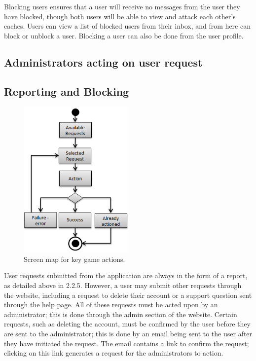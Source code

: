 Blocking users ensures that a user will receive no messages from the user they have blocked, though both users will be able to view and attack each other’s caches. Users can view a list of blocked users from their inbox, and from here can block or unblock a user. Blocking a user can  also be done from the user profile.

\subsection{Administrators acting on user request}

\subsection{Reporting and Blocking}
\begin{figure}
	\vspace{-20pt}
	\begin{center}
	\includegraphics[width=0.5\textwidth]{images/admins_acting}
	\caption{Screen map for key game actions.}
	\end{center}
	\vspace{-20pt}
\end{figure}

User requests submitted from the application are always in the form of a report, as detailed above in 2.2.5. However, a user may submit other requests through the website, including a request to delete their account or a support question sent through the help page. All of these requests must be acted upon by an administrator; this is done through the admin section of the website. Certain requests, such as deleting the account, must be confirmed by the user before they are sent to the administrator; this is done by an email being sent to the user after they have initiated the request. The email contains a link to confirm the request; clicking on this link generates a request for the administrators to action.

